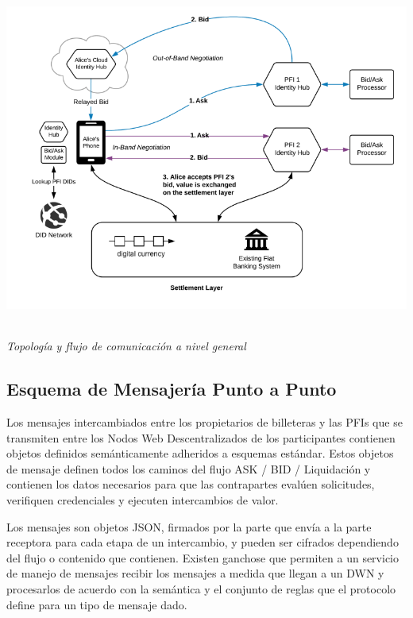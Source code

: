 \documentclass[11pt]{article}
\begin{document}
\begin{center}
  \\ \includegraphics[width=15.61cm,height=11.83cm]{./diagrams/topology.png}{\small \textit{Topología y flujo de comunicación a nivel general}}
\end{center}


\vspace{1\baselineskip}
\subsection{Esquema de Mensajería Punto a Punto}

\vspace{1\baselineskip}
Los mensajes intercambiados entre los propietarios de billeteras y las PFIs que se transmiten entre los Nodos Web Descentralizados de los participantes contienen objetos definidos semánticamente adheridos a esquemas estándar. Estos objetos de mensaje definen todos los caminos del flujo ASK / BID / Liquidación y contienen los datos necesarios para que las contrapartes evalúen solicitudes, verifiquen credenciales y ejecuten intercambios de valor.

\vspace{1\baselineskip}
Los mensajes son objetos JSON, firmados por la parte que envía a la parte receptora para cada etapa de un intercambio, y pueden ser cifrados dependiendo del flujo o contenido que contienen. Existen ganchose que permiten a un servicio de manejo de mensajes recibir los mensajes a medida que llegan a un DWN y procesarlos de acuerdo con la semántica y el conjunto de reglas que el protocolo define para un tipo de mensaje dado.
\end{document}
